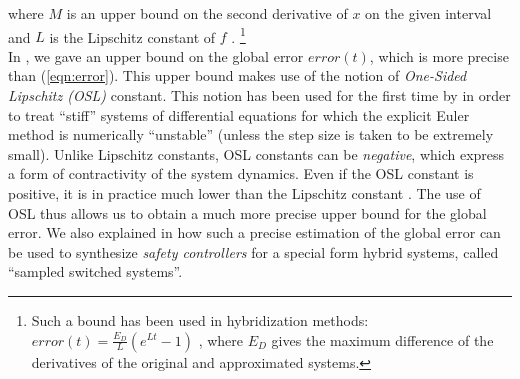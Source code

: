 where $M$ is an upper bound on the second derivative of $x$ on the given interval and $L$
is the Lipschitz constant of $f$ \cite{atkinson2008introduction}.
\footnote{Such a bound has been used in hybridization methods:
$error(t)=\frac{E_D}{L}(e^{Lt}-1)$ \cite{asarin2007hybridization,chen2016decomposed},
where $E_D$ gives the maximum difference of the derivatives of the original and approximated systems.}\\


In \cite{SNR17}, we gave an upper bound on the global error $error(t)$,
which is more precise than (\ref{eqn:error}).
%
This upper bound makes use of the notion of
{\em One-Sided Lipschitz (OSL)} constant. This notion has been used for the first
time by
\cite{donchev1998stability}
in order to treat ``stiff'' systems of differential equations for which the explicit Euler method is
numerically ``unstable'' (unless the step size is taken to be extremely small).
%
Unlike Lipschitz constants, OSL constants can be {\em negative},
which express a form of contractivity of the system dynamics.
Even if the OSL constant is positive, it is in practice much lower than
the Lipschitz constant \cite{dahlquist1976error}. The use of OSL thus allows us to obtain a much
more precise upper bound for the global error.
%
We also explained in \cite{SNR17} how such a precise estimation of the
global error can be used to synthesize {\em safety controllers} for a special
form hybrid systems, called ``sampled switched systems''.\\




